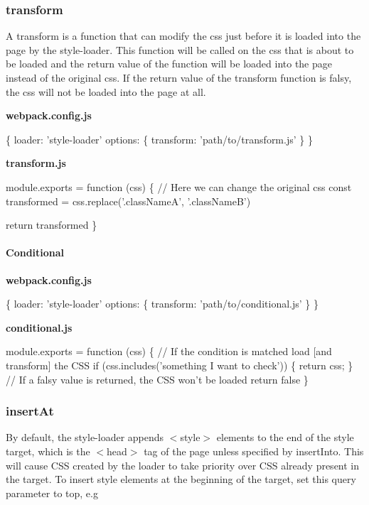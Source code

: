 \subsubsection*{{\ttfamily transform}}

A {\ttfamily transform} is a function that can modify the css just before it is loaded into the page by the style-\/loader. This function will be called on the css that is about to be loaded and the return value of the function will be loaded into the page instead of the original css. If the return value of the {\ttfamily transform} function is falsy, the css will not be loaded into the page at all.

{\bfseries webpack.\+config.\+js} 
\begin{DoxyCode}
\{
  loader: 'style-loader'
  options: \{
    transform: 'path/to/transform.js'
  \}
\}
\end{DoxyCode}


{\bfseries transform.\+js} 
\begin{DoxyCode}
module.exports = function (css) \{
  // Here we can change the original css
  const transformed = css.replace('.classNameA', '.classNameB')

  return transformed
\}
\end{DoxyCode}


\paragraph*{{\ttfamily Conditional}}

{\bfseries webpack.\+config.\+js} 
\begin{DoxyCode}
\{
  loader: 'style-loader'
  options: \{
    transform: 'path/to/conditional.js'
  \}
\}
\end{DoxyCode}


{\bfseries conditional.\+js} 
\begin{DoxyCode}
module.exports = function (css) \{
  // If the condition is matched load [and transform] the CSS
  if (css.includes('something I want to check')) \{
    return css;
  \}
  // If a falsy value is returned, the CSS won't be loaded
  return false
\}
\end{DoxyCode}


\subsubsection*{{\ttfamily insert\+At}}

By default, the style-\/loader appends {\ttfamily $<$style$>$} elements to the end of the style target, which is the {\ttfamily $<$head$>$} tag of the page unless specified by {\ttfamily insert\+Into}. This will cause C\+SS created by the loader to take priority over C\+SS already present in the target. To insert style elements at the beginning of the target, set this query parameter to \textquotesingle{}top\textquotesingle{}, e.\+g

